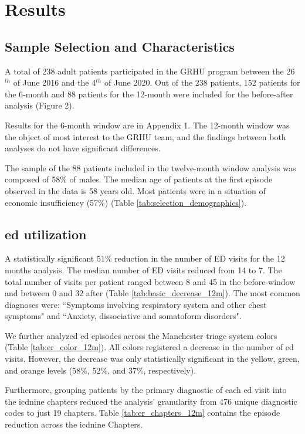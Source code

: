 \documentclass{bmcart}
\begin{document}
\section*{Results}

\subsection*{Sample Selection and Characteristics}
A total of 238 adult patients participated in the GRHU program between the 26$^{th}$ of June 2016 and the 4$^{th}$ of June 2020. 
Out of the 238 patients, 152 patients for the 6-month  and 88 patients for the 12-month  were included for the before-after analysis (Figure 2).
\par Results for the 6-month window are in Appendix 1. The 12-month window was the object of most interest to the GRHU team, and the findings between both analyses do not have significant differences.
\par The sample of the 88 patients included in the twelve-month window analysis was composed of 58\% of males. The median age of patients at the first episode observed in the data is 58 years old. Most patients were in a situation of economic insufficiency (57\%) (Table \ref{tab:selection_demographics}). 
\\
\subsection*{\gls{ed} utilization}
A statistically significant 51\% reduction in the number of ED visits for the 12 months analysis. The median number of ED visits reduced from 14 to 7. The total number of visits per patient ranged between 8 and 45 in the before-window and between 0 and 32 after (Table \ref{tab:basic_decrease_12m}). 
The most common diagnoses were: ``Symptoms involving respiratory system and other chest symptoms" and ``Anxiety, dissociative and somatoform disorders". 
\par We further analyzed \gls{ed} episodes across the Manchester triage system colors (Table \ref{tab:er_color_12m}). 
All colors registered a decrease in the number of \gls{ed} visits. 
However, the decrease was only statistically significant in the yellow, green, and orange levels (58\%, 52\%, and 37\%, respectively).
\par Furthermore, grouping patients by the primary diagnostic of each \gls{ed} visit into the \gls{icdnine} chapters reduced the analysis' granularity from  476 unique diagnostic codes to just 19 chapters. 
Table \ref{tab:er_chapters_12m} contains the episode reduction across the \gls{icdnine} Chapters.
\end{document}
